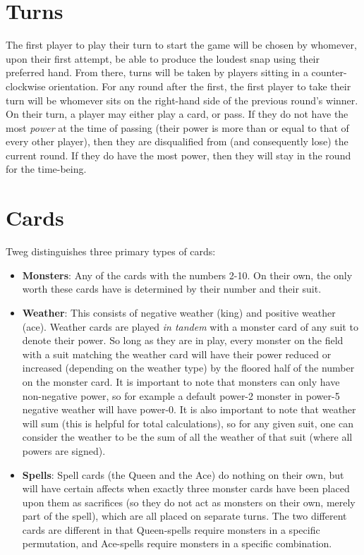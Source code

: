 \documentclass[letterpaper, reqno, 11pt]{article}
\begin{document}
\section*{Turns}
\indent The first player to play their turn to start the game will be chosen by whomever, upon their first attempt, be able to produce the loudest snap using their preferred hand. From there, turns will be taken by players sitting in a counter-clockwise orientation. For any round after the first, the first player to take their turn will be whomever sits on the right-hand side of the previous round's winner.\\
\indent On their turn, a player may either play a card, or pass. If they do not have the most \textit{power} at the time of passing (their power is more than or equal to that of every other player), then they are disqualified from (and consequently lose) the current round. If they do have the most power, then they will stay in the round for the time-being.

\section*{Cards}
Tweg distinguishes three primary types of cards:
\begin{itemize}
\item \textbf{Monsters}: Any of the cards with the numbers 2-10. On their own, the only worth these cards have is determined by their number and their suit.
\item \textbf{Weather}: This consists of negative weather (king) and positive weather (ace). Weather cards are played \textit{in tandem} with a monster card of any suit to denote their power. So long as they are in play, every monster on the field with a suit matching the weather card will have their power reduced or increased (depending on the weather type) by the floored half of the number on the monster card. It is important to note that monsters can only have non-negative power, so for example a default power-2 monster in power-5 negative weather will have power-0. It is also important to note that weather will sum (this is helpful for total calculations), so for any given suit, one can consider the weather to be the sum of all the weather of that suit (where all powers are signed).
\item \textbf{Spells}: Spell cards (the Queen and the Ace) do nothing on their own, but will have certain affects when exactly three monster cards have been placed upon them as sacrifices (so they do not act as monsters on their own, merely part of the spell), which are all placed on separate turns. The two different cards are different in that Queen-spells require monsters in a specific permutation, and Ace-spells require monsters in a specific combination.
\end{itemize}
\end{document}
